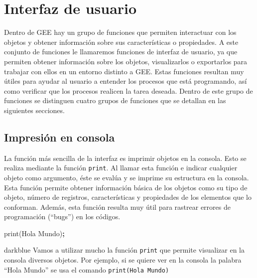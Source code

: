 \documentclass[
  12pt,
  letterpaper,
  twoside]{book}
\newenvironment{Shaded}{\begin{snugshade}}{\end{snugshade}}
\newcommand{\FunctionTok}[1]{\textcolor[rgb]{0.00,0.00,0.00}{#1}}
\newcommand{\NormalTok}[1]{#1}
\newcommand{\OperatorTok}[1]{\textcolor[rgb]{0.81,0.36,0.00}{\textbf{#1}}}
\newcommand{\StringTok}[1]{\textcolor[rgb]{0.31,0.60,0.02}{#1}}
\begin{document}
\newpage

\hypertarget{interfaz-de-usuario}{%
\chapter{Interfaz de usuario}\label{interfaz-de-usuario}}

Dentro de GEE hay un grupo de funciones que permiten interactuar con los objetos y obtener información sobre sus características o propiedades. A este conjunto de funciones le llamaremos funciones de interfaz de usuario, ya que permiten obtener información sobre los objetos, visualizarlos o exportarlos para trabajar con ellos en un entorno distinto a GEE. Estas funciones resultan muy útiles para ayudar al usuario a entender los procesos que está programando, así como verificar que los procesos realicen la tarea deseada. Dentro de este grupo de funciones se distinguen cuatro grupos de funciones que se detallan en las siguientes secciones.

\hypertarget{impresiuxf3n-en-consola}{%
\section{Impresión en consola}\label{impresiuxf3n-en-consola}}

La función más sencilla de la interfaz es imprimir objetos en la consola. Esto se realiza mediante la función \texttt{print}. Al llamar esta función e indicar cualquier objeto como argumento, éste se evalúa y se imprime su estructura en la consola. Esta función permite obtener información básica de los objetos como su tipo de objeto, número de registros, características y propiedades de los elementos que lo conforman. Además, esta función resulta muy útil para rastrear errores de programación (``bugs'') en los códigos.

\begin{Shaded}
\begin{Highlighting}[]
\FunctionTok{print}\NormalTok{(}\StringTok{\textquotesingle{}Hola Mundo\textquotesingle{}}\NormalTok{)}\OperatorTok{;}
\end{Highlighting}
\end{Shaded}

\begin{bluebox2}

\begin{awesomeblock}{5pt}{\faLightbulb}{darkblue}
Vamos a utilizar mucho la función \texttt{print} que permite visualizar en la consola diversos objetos. Por ejemplo, si se quiere ver en la consola la palabra ``Hola Mundo'' se usa el comando \texttt{print(\textquotesingle{}Hola\ Mundo\textquotesingle{})}

\end{awesomeblock}

\end{bluebox2}
\end{document}
